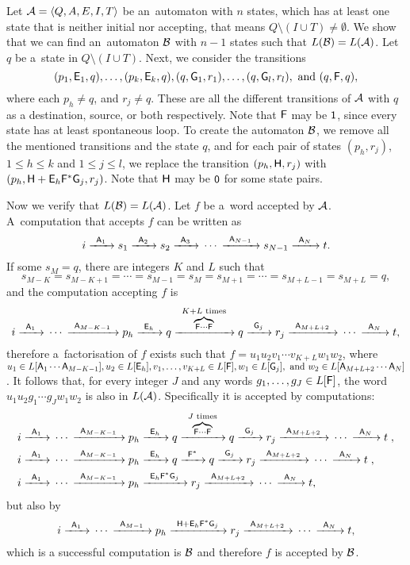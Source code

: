 Let $\aut{A} = \langle Q, A, E, I, T \rangle$ be an~automaton with $n$ states, which has at least one state that is neither initial nor accepting, that means $Q \setminus (I \cup T) \neq \emptyset$. We show that we can find an~automaton $\aut{B}$ with $n - 1$ states such that $L(\aut{B}) = L(\aut{A})$. Let $q$ be a~state in $Q \setminus (I \cup T)$. Next, we consider the transitions
\[
    (p_1, \re{E}_1, q), \dotsc, (p_k, \re{E}_k, q), (q, \re{G}_1, r_1), \dotsc, (q, \re{G}_l, r_l), \text{ and } (q, \re{F}, q),
\]
where each $p_h \neq q$, and $r_j \neq q$. These are all the different transitions of $\aut{A}$ with $q$ as a destination, source, or both respectively. Note that $\re{F}$ may be $\re{1}$, since every state has at least spontaneous loop. To create the automaton $\aut{B}$, we remove all the mentioned transitions and the state $q$, and for each pair of states $(p_h, r_j)$, $1 \leq h \leq k$ and $1 \leq j \leq l$, we replace the transition $(p_h, \re{H}, r_j)$ with $(p_h, \re{H} + \re{E}_h\re{F}^*\re{G}_j, r_j)$. Note that $\re{H}$ may be $\re{0}$ for some state pairs.

Now we verify that $L(\aut{B}) = L(\aut{A})$. Let $f$ be a~word accepted by $\aut{A}$. A~computation that accepts $f$ can be written as
\[
    i \tr{\re{A}_1} s_1 \tr{\re{A}_2} s_2 \tr{\re{A}_3} \dotsm \tr{\re{A}_{N-1}} s_{N-1} \tr{\re{A}_N} t.
\]
If some $s_M = q$, there are integers $K$ and $L$ such that
\[
    s_{M-K} = s_{M-K+1} = \dotsb = s_{M-1} = s_M = s_{M+1} = \dotsb = s_{M+L-1} = s_{M+L} = q,
\]
and the computation accepting $f$ is
\[
    i \tr{\re{A}_1} \dotsm \tr{\re{A}_{M-K-1}} p_h \tr{\re{E}_h} q \tr{\overbrace{\scriptstyle \re{F} \dotsm \re{F}}^{\scriptstyle K+L \text{ times}}} q \tr{\re{G}_j} r_j \tr{\re{A}_{M+L+2}} \dotsm \tr{\re{A}_N} t,
\]
therefore a~factorisation of $f$ exists such that $f = u_1 u_2 v_1 \dotsm v_{K + L} w_1 w_2$, where $u_1 \in L[\re{A}_1 \dotsm \re{A}_{M-K-1}], u_2 \in L[\re{E}_h], v_1, \dotsc, v_{K+L} \in L[\re{F}], w_1 \in L[\re{G}_j], \text{ and } w_2 \in L[\re{A}_{M+L+2} \dotsm \re{A}_N]$. It follows that, for every integer $J$ and any words $g_1, \dotsc, g_J \in L[\re{F}]$, the word $u_1 u_2 g_1 \dotsm g_J w_1 w_2$ is also in $L(\aut{A})$. Specifically it is accepted by computations:
\begin{align*}
    i \tr{\re{A}_1} \dotsm \tr{\re{A}_{M-K-1}} &p_h \tr{\re{E}_h} q \tr{\overbrace{\scriptstyle \re{F} \dotsm \re{F}}^{\scriptstyle J \text{ times}}} q \tr{\re{G}_j} r_j \tr{\re{A}_{M+L+2}} \dotsm \tr{\re{A}_N} t \; , \\
    i \tr{\re{A}_1} \dotsm \tr{\re{A}_{M-K-1}} &p_h \tr{\re{E}_h} q \tr{\re{F}^*} q \tr{\re{G}_j} r_j \tr{\re{A}_{M+L+2}} \dotsm \tr{\re{A}_N} t \; , \\
    i \tr{\re{A}_1} \dotsm \tr{\re{A}_{M-K-1}} &p_h \tr{\re{E}_h\re{F}^*\re{G}_j} r_j \tr{\re{A}_{M+L+2}} \dotsm \tr{\re{A}_N} t,
\end{align*}
but also by
\[
    i \tr{\re{A}_1} \dotsm \tr{\re{A}_{M-1}} p_h \tr{\re{H} + \re{E}_h\re{F}^*\re{G}_j} r_j \tr{\re{A}_{M+L+2}} \dotsm \tr{\re{A}_N} t,
\]
which is a successful computation is $\aut{B}$ and therefore $f$ is accepted by $\aut{B}$.

